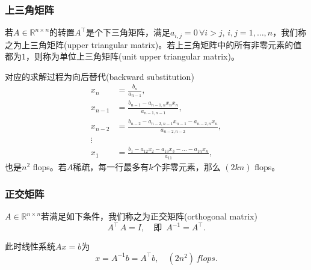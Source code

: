 \begin{subappendices}
\subsubsection{上三角矩阵}
若$A \in \mathbb{R}^{n \times n}$的转置$A^{\top}$是个下三角矩阵，满足$a_{i,j} =0 \, \forall i > j, \, i,j=1,\ldots,n$，我们称之为上三角矩阵(upper triangular matrix)。若上三角矩阵中的所有非零元素的值都为$1$，则称为单位上三角矩阵(unit upper triangular matrix)。

对应的求解过程为向后替代(backward substitution)
\begin{equation*}
\begin{split}
    x_{n} & = \frac{b_{n}}{a_{n-1}}, \\
    x_{n-1} & = \frac{
    b_{n-1} - a_{n-1,n} x_{n} x_{n}
    }{
    a_{n-1,n-1}
    }, \\
    x_{n-2} & = \frac{
    b_{n-2} - a_{n-2,n-1} x_{n-1} - a_{n-2,n} x_{n}
    }{
    a_{n-2,n-2}
    }, \\
    \vdots & \\
    x_{1} & = \frac{
    b_{1} - a_{12}x_{2} - a_{13}x_{3} - \ldots - a_{1n}x_{n}
    }{
    a_{11}
    },
\end{split}
\end{equation*}
也是$n^{2}$ flops。若$A$稀疏，每一行最多有$k$个非零元素，那么 $\left(2 kn \right)$ flops。

\subsubsection{正交矩阵}
\label{sec:numlin-matrix-orthogonality}
$A \in \mathbb{R}^{n \times n}$若满足如下条件，我们称之为正交矩阵(orthogonal matrix)
\begin{equation*}
  A^{\top} \, A = I, \quad \text{即 } \, A^{-1} = A^{\top}.
\end{equation*}

此时线性系统$A x = b$为
\begin{equation*}
  x = A^{-1} b = A^{\top} b, \quad \left( 2n^{2} \right) \, flops.
\end{equation*}


\end{subappendices}
